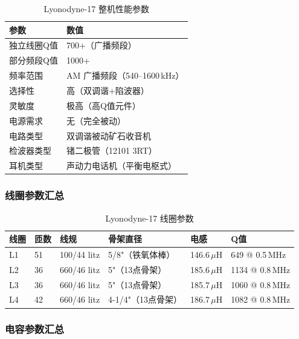 \begin{table}[htbp]
    \centering
    \caption{Lyonodyne-17 整机性能参数}
    \label{tab:lyonodyne_performance}
    \begin{tabular}{lp{8cm}}
        \toprule
        \textbf{参数} & \textbf{数值} \\
        \midrule
        独立线圈Q值 & 700+（广播频段） \\
        部分频段Q值 & 1000+ \\
        频率范围 & AM 广播频段（540--1600\,kHz） \\
        选择性 & 高（双调谐+陷波器） \\
        灵敏度 & 极高（高Q值元件） \\
        电源需求 & 无（完全被动） \\
        电路类型 & 双调谐被动矿石收音机 \\
        检波器类型 & 锗二极管（12101 3RT） \\
        耳机类型 & 声动力电话机（平衡电枢式） \\
        \bottomrule
    \end{tabular}
\end{table}

\subsubsection*{线圈参数汇总}

\begin{table}[htbp]
    \centering
    \caption{Lyonodyne-17 线圈参数}
    \label{tab:lyonodyne_coils}
    \begin{tabular}{llllll}
        \toprule
        \textbf{线圈} & \textbf{匝数} & \textbf{线规} & \textbf{骨架直径} & \textbf{电感} & \textbf{Q值} \\
        \midrule
        L1 & 51 & 100/44 litz & 5/8"（铁氧体棒） & 146.6\,$\mu$H & 649 @ 0.5\,MHz \\
        L2 & 36 & 660/46 litz & 5"（13点骨架） & 185.6\,$\mu$H & 1134 @ 0.8\,MHz \\
        L3 & 36 & 660/46 litz & 5"（13点骨架） & 185.7\,$\mu$H & 1060 @ 0.8\,MHz \\
        L4 & 42 & 660/46 litz & 4-1/4"（13点骨架） & 186.7\,$\mu$H & 1082 @ 0.8\,MHz \\
        \bottomrule
    \end{tabular}
\end{table}

\subsubsection*{电容参数汇总}

